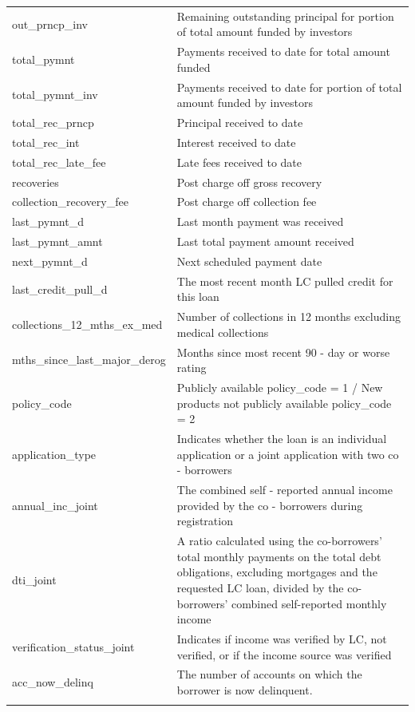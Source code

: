 \documentclass[11pt,]{report}
\begin{document}
\begin{longtable}[t]{>{\raggedright\arraybackslash}p{7cm}>{\raggedright\arraybackslash}p{7cm}}
\addlinespace
out\_prncp\_inv & Remaining outstanding principal for portion of total amount funded by investors\\
total\_pymnt & Payments received to date for total amount funded\\
total\_pymnt\_inv & Payments received to date for portion of total amount funded by investors\\
total\_rec\_prncp & Principal received to date\\
total\_rec\_int & Interest received to date\\
\addlinespace
total\_rec\_late\_fee & Late fees received to date\\
recoveries & Post charge off gross recovery\\
collection\_recovery\_fee & Post charge off collection fee\\
last\_pymnt\_d & Last month payment was received\\
last\_pymnt\_amnt & Last total payment amount received\\
\addlinespace
next\_pymnt\_d & Next scheduled payment date\\
last\_credit\_pull\_d & The most recent month LC pulled credit for this loan\\
collections\_12\_mths\_ex\_med & Number of collections in 12 months excluding medical collections\\
mths\_since\_last\_major\_derog & Months since most recent 90 -
    day or worse rating\\
policy\_code & Publicly available policy\_code =
    1 / New products not publicly available policy\_code = 2\\
\addlinespace
application\_type & Indicates whether the loan is an individual application or a joint application with two co -
    borrowers\\
annual\_inc\_joint & The combined self -
    reported annual income provided by the co - borrowers during registration\\
dti\_joint & A ratio calculated using the co-borrowers' total monthly payments on the total debt obligations, excluding mortgages and the requested LC loan, divided by the co-borrowers' combined self-reported monthly income\\
verification\_status\_joint & Indicates if income was verified by LC,
  not verified,
  or if the income source was verified\\
acc\_now\_delinq & The number of accounts on which the borrower is now delinquent.\\
\addlinespace

\end{longtable}
\end{document}
